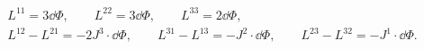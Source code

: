 \begin{equation}
\begin{gathered}
   L^{11}=3\dd\Phi,\qquad L^{22}=3\dd\Phi,\qquad L^{33}=2\dd\Phi, \\
   L^{12}-L^{21}=-2J^3\cdot\dd\Phi,\qquad
   L^{31}-L^{13}=-J^2\cdot\dd\Phi,\qquad
   L^{23}-L^{32}=-J^1\cdot\dd\Phi.\qquad 
\end{gathered}
\end{equation}

